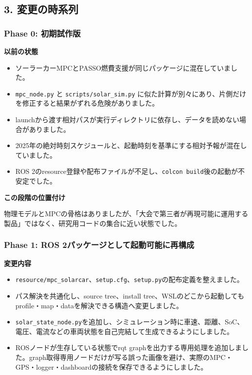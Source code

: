 \documentclass[
  japanese,
  a4paper,
  11pt]{article}
\providecommand{\tightlist}{%
  \setlength{\itemsep}{0pt}\setlength{\parskip}{0pt}}
\begin{document}
\subsection{3.
変更の時系列}\label{3-ux5909ux66f4ux306eux6642ux7cfbux5217}

\subsubsection{Phase 0:
初期試作版}\label{phase-0-ux521dux671fux8a66ux4f5cux7248}

\textbf{以前の状態}

\begin{itemize}
\tightlist
\item
  ソーラーカーMPCとPASSO燃費支援が同じパッケージに混在していました。
\item
  \texttt{mpc\_node.py} と \texttt{scripts/solar\_sim.py}
  に似た計算が別々にあり、片側だけを修正すると結果がずれる危険がありました。
\item
  launchから渡す相対パスが実行ディレクトリに依存し、データを読めない場合がありました。
\item
  2025年の絶対時刻スケジュールと、起動時刻を基準にする相対予報が混在していました。
\item
  ROS
  2のresource登録や配布ファイルが不足し、\texttt{colcon\ build}後の起動が不安定でした。
\end{itemize}

\textbf{この段階の位置付け}

物理モデルとMPCの骨格はありましたが、「大会で第三者が再現可能に運用する製品」ではなく、研究用コードの集合に近い状態でした。

\subsubsection{Phase 1: ROS
2パッケージとして起動可能に再構成}\label{phase-1-ros-2ux30d1ux30c3ux30b1ux30fcux30b8ux3068ux3057ux3066ux8d77ux52d5ux53efux80fdux306bux518dux69cbux6210}

\textbf{変更内容}

\begin{itemize}
\tightlist
\item
  \texttt{resource/mpc\_solarcar}、\texttt{setup.cfg}、\texttt{setup.py}の配布定義を整えました。
\item
  パス解決を共通化し、source tree、install
  tree、WSLのどこから起動してもprofile・map・dataを解決できる構造へ変更しました。
\item
  \texttt{solar\_state\_node.py}を追加し、シミュレーション時に車速、距離、SoC、電圧、電流などの車両状態を自己完結して生成できるようにしました。
\item
  ROSノードが生存している状態でrqt
  graphを出力する専用処理を追加しました。graph取得専用ノードだけが写る誤った画像を避け、実際のMPC・GPS・logger・dashboardの接続を保存できるようにしました。
\end{itemize}
\end{document}

